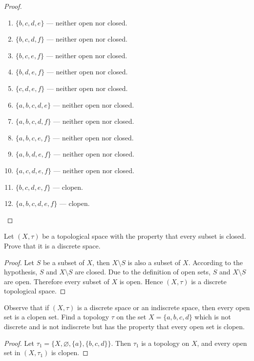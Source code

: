 \begin{proof}
\begin{enumerate}[label={(\arabic*)}]
        \item $\{ b, c, d, e \}$ --- neither open nor closed.
        \item $\{ b, c, d, f \}$ --- neither open nor closed.
        \item $\{ b, c, e, f \}$ --- neither open nor closed.
        \item $\{ b, d, e, f \}$ --- neither open nor closed.
        \item $\{ c, d, e, f \}$ --- neither open nor closed.
        \item $\{ a, b, c, d, e \}$ --- neither open nor closed.
        \item $\{ a, b, c, d, f \}$ --- neither open nor closed.
        \item $\{ a, b, c, e, f \}$ --- neither open nor closed.
        \item $\{ a, b, d, e, f \}$ --- neither open nor closed.
        \item $\{ a, c, d, e, f \}$ --- neither open nor closed.
        \item $\{ b, c, d, e, f \}$ --- clopen.
        \item $\{ a, b, c, d, e, f \}$ --- clopen.
    \end{enumerate}
\end{proof}
\newpage

\begin{exercise}
    Let $(X, \tau)$ be a topological space with the property that every subset is closed. Prove that it is a discrete space.
\end{exercise}

\begin{proof}
    Let $S$ be a subset of $X$, then $X\setminus S$ is also a subset of $X$. According to the hypothesis, $S$ and $X\setminus S$ are closed. Due to the definition of open sets, $S$ and $X\setminus S$ are open. Therefore every subset of $X$ is open. Hence $(X, \tau)$ is a discrete topological space.
\end{proof}
\newpage

\begin{exercise}
    Observe that if $(X, \tau)$ is a discrete space or an indiscrete space, then every open set is a clopen set. Find a topology $\tau$ on the set $X = \{ a, b, c, d \}$ which is not discrete and is not indiscrete but has the property that every open set is clopen.
\end{exercise}

\begin{proof}
    Let $\tau_{1} = \{ X, \varnothing, \{ a \}, \{ b, c, d \} \}$. Then $\tau_{1}$ is a topology on $X$, and every open set in $(X, \tau_{1})$ is clopen.
\end{proof}
\newpage

